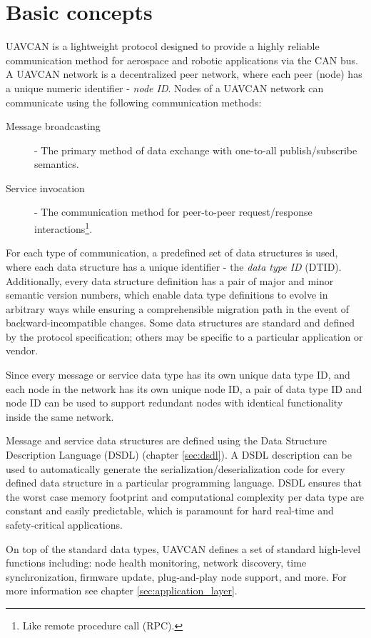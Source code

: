 \chapter{Basic concepts}\label{sec:basic_concepts}

UAVCAN is a lightweight protocol designed to provide a highly reliable communication method for
aerospace and robotic applications via the CAN bus.
A UAVCAN network is a decentralized peer network, where each peer (node) has a unique
numeric identifier - \emph{node ID}.
Nodes of a UAVCAN network can communicate using the following communication methods:
\begin{description}
    \item[Message broadcasting] - The primary method of data exchange with one-to-all publish/subscribe semantics.
    \item[Service invocation] - The communication method for peer-to-peer request/response
    interactions\footnote{Like remote procedure call (RPC).}.
\end{description}

For each type of communication, a predefined set of data structures is used,
where each data structure has a unique identifier - the \emph{data type ID} (DTID).
Additionally, every data structure definition has a pair of major and minor semantic version numbers,
which enable data type definitions to evolve in arbitrary ways while ensuring a comprehensible
migration path in the event of backward-incompatible changes.
Some data structures are standard and defined by the protocol specification;
others may be specific to a particular application or vendor.

Since every message or service data type has its own unique data type ID,
and each node in the network has its own unique node ID,
a pair of data type ID and node ID can be used to support redundant nodes with identical
functionality inside the same network.

Message and service data structures are defined using the Data Structure Description Language
(DSDL) (chapter \ref{sec:dsdl}).
A DSDL description can be used to automatically generate the serialization/deserialization code
for every defined data structure in a particular programming language.
DSDL ensures that the worst case memory footprint and computational complexity per data type
are constant and easily predictable, which is paramount for hard real-time and safety-critical applications.

On top of the standard data types, UAVCAN defines a set of standard high-level functions including:
node health monitoring, network discovery, time synchronization, firmware update,
plug-and-play node support, and more.
For more information see chapter \ref{sec:application_layer}.

